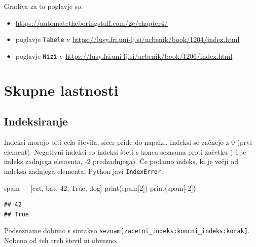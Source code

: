 \documentclass[
]{report}
\newenvironment{Shaded}{\begin{snugshade}}{\end{snugshade}}
\newcommand{\BuiltInTok}[1]{#1}
\newcommand{\DecValTok}[1]{\textcolor[rgb]{0.00,0.00,0.81}{#1}}
\newcommand{\NormalTok}[1]{#1}
\newcommand{\OperatorTok}[1]{\textcolor[rgb]{0.81,0.36,0.00}{\textbf{#1}}}
\newcommand{\StringTok}[1]{\textcolor[rgb]{0.31,0.60,0.02}{#1}}
\newcommand{\VariableTok}[1]{\textcolor[rgb]{0.00,0.00,0.00}{#1}}
\providecommand{\tightlist}{%
  \setlength{\itemsep}{0pt}\setlength{\parskip}{0pt}}
\begin{document}
Gradiva za to poglavje so:

\begin{itemize}
\tightlist
\item
  \url{https://automatetheboringstuff.com/2e/chapter4/}
\item
  poglavje \texttt{Tabele} v \url{https://lusy.fri.uni-lj.si/ucbenik/book/1204/index.html}
\item
  poglavje \texttt{Nizi} v \url{https://lusy.fri.uni-lj.si/ucbenik/book/1206/index.html}
\end{itemize}

\hypertarget{skupne-lastnosti}{%
\section{Skupne lastnosti}\label{skupne-lastnosti}}

\hypertarget{indeksiranje}{%
\subsection{Indeksiranje}\label{indeksiranje}}

Indeksi morajo biti cela števila, sicer pride do napake. Indeksi se začnejo z 0 (prvi element). Negativni indeksi so
indeksi šteti s konca seznama proti začetku (-1 je indeks zadnjega elementa, -2 predzadnjega). Če podamo indeks, ki je večji od indeksa zadnjega elementa, Python javi \texttt{IndexError}.

\begin{Shaded}
\begin{Highlighting}[]
\NormalTok{spam }\OperatorTok{=}\NormalTok{ [}\StringTok{\textquotesingle{}cat\textquotesingle{}}\NormalTok{, }\StringTok{\textquotesingle{}bat\textquotesingle{}}\NormalTok{, }\DecValTok{42}\NormalTok{, }\VariableTok{True}\NormalTok{, }\StringTok{\textquotesingle{}dog\textquotesingle{}}\NormalTok{]}
\BuiltInTok{print}\NormalTok{(spam[}\DecValTok{2}\NormalTok{])}
\BuiltInTok{print}\NormalTok{(spam[}\OperatorTok{{-}}\DecValTok{2}\NormalTok{])}
\end{Highlighting}
\end{Shaded}

\begin{verbatim}
## 42
## True
\end{verbatim}

Podsezname dobimo s sintakso \texttt{seznam{[}zacetni\_indeks:koncni\_indeks:korak{]}}. Nobeno
od teh treh števil ni obvezno.
\end{document}
